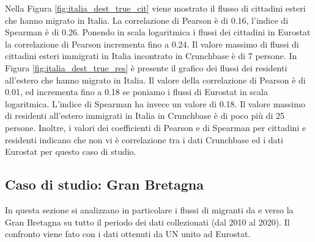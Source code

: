 Nella Figura \ref{fig:italia_dest_true_cit} viene mostrato il flusso di cittadini esteri che hanno migrato in Italia. 
La correlazione di Pearson è di 0.16, l'indice di Spearman è di 0.26. Ponendo in scala logaritmica i flussi dei cittadini in Eurostat la correlazione di Pearson incrementa fino a 0.24. Il valore massimo di flussi di cittadini esteri immigrati in Italia incontrato in Crunchbase è di 7 persone. 
In Figura \ref{fig:italia_dest_true_res} è presente il grafico dei flussi dei residenti all'estero che hanno migrato in Italia. Il valore della correlazione di Pearson è di 0.01, ed incrementa fino a 0.18 se poniamo i flussi di Eurostat in scala logaritmica. L'indice di Spearman ha invece un valore di 0.18. Il valore massimo di residenti all'estero immigrati in Italia in Crunchbase è di poco più di 25 persone. Inoltre, i valori dei coefficienti di Pearson e di Spearman per cittadini e residenti indicano che non vi è correlazione tra i dati Crunchbase ed i dati Eurostat per questo caso di studio.

\FloatBarrier

\subsection{Caso di studio: Gran Bretagna}
\label{CASOFLUSSIGBR}
In questa sezione si analizzano in particolare i flussi di migranti da e verso la Gran Bretagna su tutto il periodo dei dati collezionati (dal 2010 al 2020). Il confronto viene fato con i dati ottenuti da UN unito ad Eurostat.
